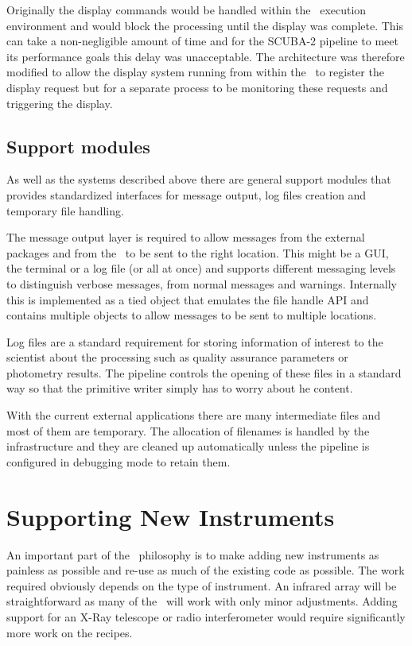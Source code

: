 \documentclass[final,authoryear,5p,times,twocolumn]{elsarticle}
\begin{document}
Originally the display commands would be handled within the \recipe\
execution environment and would block the processing until the display
was complete. This can take a non-negligible amount of time and for the
SCUBA-2 pipeline to meet its performance goals this delay was
unacceptable. The architecture was therefore modified to allow the
display system running from within the \recipe\ to register the
display request but for a separate process to be monitoring these
requests and triggering the display.

\subsection{Support modules}

As well as the systems described above there are general support
modules that provides standardized interfaces for message output, log files
creation and temporary file handling.

The message output layer is required
to allow messages from the external packages and from the \primitives\
to be sent to the right location. This might be a GUI, the terminal or
a log file (or all at once) and supports different messaging levels to
distinguish verbose messages, from normal messages and
warnings. Internally this is implemented as a tied object that
emulates the file handle API and contains multiple objects to allow
messages to be sent to multiple locations.

Log files are a standard requirement for storing information of
interest to the scientist about the processing such as
quality assurance parameters or photometry results. The pipeline
controls the opening of these files in a standard way so that the
primitive writer simply has to worry about he content.

With the current external applications there are many intermediate files
and most of them are temporary. The allocation of filenames is handled
by the infrastructure and they are cleaned up automatically unless the
pipeline is configured in debugging mode to retain them.

\section{Supporting New Instruments}

An important part of the \oracdr\ philosophy is to make adding new
instruments as painless as possible and re-use as much of the
existing code as possible. The work required obviously depends on the
type of instrument. An infrared array will be straightforward as many
of the \recipes\ will work with only minor adjustments. Adding support
for an X-Ray telescope or radio interferometer would require
significantly more work on the recipes.
\end{document}
